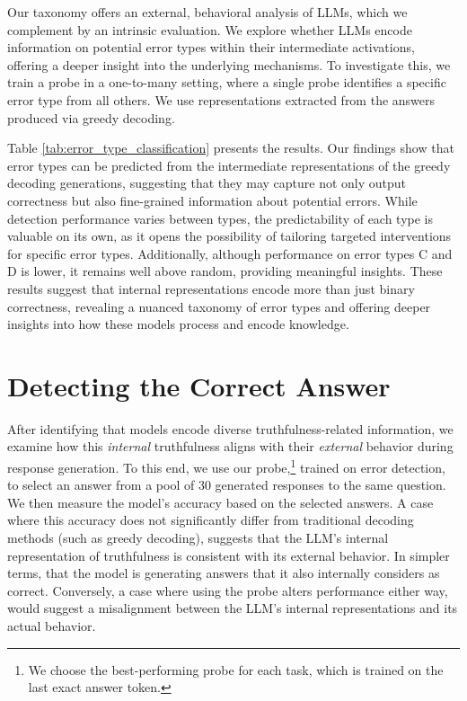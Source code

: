 \documentclass{article} %
\begin{document}
Our taxonomy offers an external, behavioral analysis of LLMs, which we complement by an intrinsic evaluation.
We explore whether LLMs encode information on potential error types within their intermediate activations, offering a deeper insight into the underlying mechanisms.
To investigate this, we train a probe in a one-to-many setting, where a single probe identifies a specific error type from all others. We use representations extracted from the answers produced via greedy decoding.

Table \ref{tab:error_type_classification} presents the results.
Our findings show that error types can be predicted from the intermediate representations of the greedy decoding generations, suggesting that they may capture not only output correctness but also fine-grained information about potential errors.
While detection performance varies between types, the predictability of each type is valuable on its own, as it opens the possibility of tailoring targeted interventions for specific error types. 
Additionally, although performance on error types C and D is lower, it remains well above random, providing meaningful insights.
These results suggest that internal representations encode more than just binary correctness, revealing a nuanced taxonomy of error types and offering deeper insights into how these models process and encode knowledge.



\section{Detecting the Correct Answer}
\label{sec:choosing_correct_answer}

After identifying that models encode diverse truthfulness-related information, we examine how this \textit{internal} truthfulness aligns with their \textit{external} behavior during response generation.
To this end, we use our probe,\footnote{We choose the best-performing probe for each task, which is trained on the last exact answer token.} trained on error detection, to select an answer from a pool of 30 generated responses to the same question.
We then measure the model's accuracy based on the selected answers.
A case where this accuracy does not significantly differ from traditional decoding methods (such as greedy decoding), suggests that the LLM's internal representation of truthfulness is consistent with its external behavior.
In simpler terms, that the model is generating answers that it also internally considers as correct.
Conversely, a case where using the probe alters performance either way, would suggest a misalignment between the LLM’s internal representations and its actual behavior.
\end{document}
